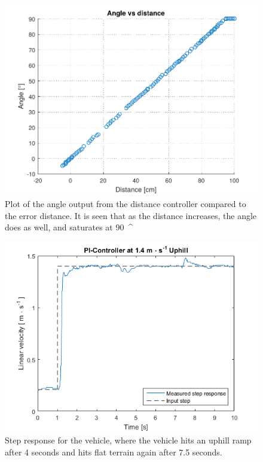 \begin{figure}[H]
  \centering
	\includegraphics[scale=0.8]{figures/AccTest7.pdf}
	\caption{Plot of the angle output from the distance controller compared to the error distance. It is seen that as the distance increases, the angle does as well, and saturates at \SI{90}{^\circ}}
	\label{AccT7fig}
\end{figure}\vspace{-5mm}

\begin{figure}[H]
  \centering
	\includegraphics[scale=0.8]{figures/AccTest8U.png}
	\caption{Step response for the vehicle, where the vehicle hits an uphill ramp after 4 seconds and hits flat terrain again after \SI{7,5}{} seconds.}
	\label{AccT8Ufig}
\end{figure}\vspace{-5mm}

